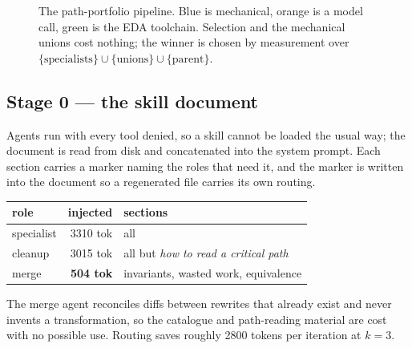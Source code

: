 \documentclass[11pt,a4paper]{article}
\begin{document}
\begin{figure}[t]
\caption{The path-portfolio pipeline. Blue is mechanical, orange is a model
call, green is the EDA toolchain. Selection and the mechanical unions cost
nothing; the winner is chosen by measurement over
$\{\text{specialists}\}\cup\{\text{unions}\}\cup\{\text{parent}\}$.}
\label{fig:pipeline}
\end{figure}

\subsection{Stage 0 --- the skill document}

Agents run with every tool denied, so a skill cannot be loaded the usual way;
the document is read from disk and concatenated into the system prompt. Each
section carries a marker naming the roles that need it, and the marker is
written into the document so a regenerated file carries its own routing.

\begin{center}
\begin{tabular}{@{}lrl@{}}
\toprule
role & injected & sections \\
\midrule
specialist & 3310 tok & all \\
cleanup    & 3015 tok & all but \emph{how to read a critical path} \\
merge      &  \textbf{504 tok} & invariants, wasted work, equivalence \\
\bottomrule
\end{tabular}
\end{center}

\noindent
The merge agent reconciles diffs between rewrites that already exist and never
invents a transformation, so the catalogue and path-reading material are cost
with no possible use. Routing saves roughly 2800 tokens per iteration at
$k=3$.
\end{document}
